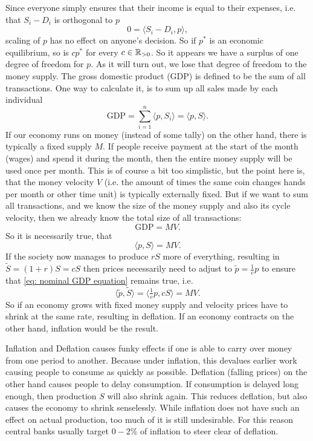 Since everyone simply ensures that their income is equal to their expenses, i.e.
that \(S_i - D_i\) is orthogonal to \(p\)
\[
	0 = \langle S_i - D_i, p\rangle,
\]
scaling of \(p\) has no effect on anyone's decision. So if \(p^*\) is an
economic equilibrium, so is \(cp^*\) for every \(c\in \mathbb{R}_{>0}\). So it
appears we have a surplus of one degree of freedom for \(p\). As it will turn
out, we lose that degree of freedom to the money supply.
The gross domestic product (GDP) is defined to be the sum of all transactions.
One way to calculate it, is to sum up all sales made by each individual
\[
	\text{GDP} = \sum_{i=1}^n \langle p, S_i\rangle = \langle p, S\rangle.
\]
If our economy runs on money (instead of some tally) on the other hand, there
is typically a fixed supply \(M\). If people receive payment at the start of
the month (wages) and spend it during the month, then the entire money supply
will be used once per month. This is of course a bit too simplistic, but the
point here is, that the money velocity \(V\) (i.e. the amount of times the same
coin changes hands per month or other time unit) is typically externally fixed.
But if we want to sum all transactions, and we know the size of the money supply
and also its cycle velocity, then we already know the total size of all
transactions:
\[
	\text{GDP} = MV.
\]
So it is necessarily true, that 
\begin{equation}
	\label{eq: nominal GDP equation}
	\langle p, S\rangle = MV.	
\end{equation}
If the society now manages to produce \(rS\) more of everything, resulting
in \(\tilde{S} = (1+r) S = cS\) then prices necessarily need to adjust to
\(\tilde{p} = \tfrac1c p\) to ensure that \eqref{eq: nominal GDP equation}
remains true, i.e.
\[
	\langle \tilde{p}, \tilde{S}\rangle = \langle \tfrac1c p, cS\rangle = MV.
\]
So if an economy grows with fixed money supply and velocity prices have to
shrink at the same rate, resulting in deflation. If an economy contracts on the
other hand, inflation would be the result.

Inflation and Deflation causes funky effects if one is able to carry over
money from one period to another. Because under inflation, this devalues earlier
work causing people to consume as quickly as possible. Deflation (falling
prices) on the other hand causes people to delay consumption. If consumption is
delayed long enough, then production \(S\) will also shrink again. This reduces
deflation, but also causes the economy to shrink senselessly. While inflation
does not have such an effect on actual production, too much of it is still
undesirable. For this reason central banks usually target \(0-2\%\) of inflation
to steer clear of deflation.

